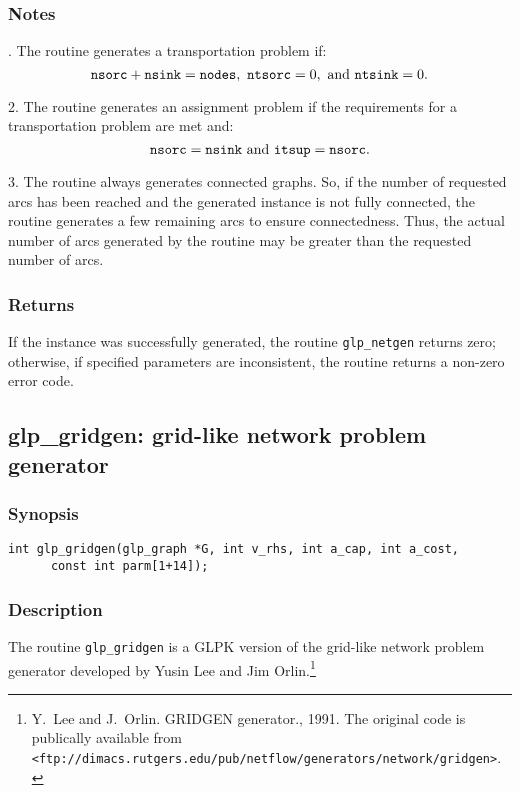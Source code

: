 \subsubsection*{Notes}

\noindent{}. The routine generates a transportation problem if:
$${\tt nsorc}+{\tt nsink}={\tt nodes},
\  {\tt ntsorc}=0,\ \mbox{and}\ {\tt ntsink}=0.$$

2. The routine generates an assignment problem if the requirements for
a transportation problem are met and:
$${\tt nsorc}={\tt nsink}\ \mbox{and}\ {\tt itsup}={\tt nsorc}.$$

3. The routine always generates connected graphs. So, if the number of
requested arcs has been reached and the generated instance is not fully
connected, the routine generates a few remaining arcs to ensure
connectedness. Thus, the actual number of arcs generated by the routine
may be greater than the requested number of arcs.

\subsubsection*{Returns}

If the instance was successfully generated, the routine
\verb|glp_netgen| returns zero; otherwise, if specified parameters are
inconsistent, the routine returns a non-zero error code.

\subsection{glp\_gridgen: grid-like network problem generator}

\subsubsection*{Synopsis}

\begin{verbatim}
int glp_gridgen(glp_graph *G, int v_rhs, int a_cap, int a_cost,
      const int parm[1+14]);
\end{verbatim}

\subsubsection*{Description}

The routine \verb|glp_gridgen| is a GLPK version of the grid-like
network problem generator developed by Yusin Lee and Jim
Orlin.\footnote{Y.~Lee and J.~Orlin. GRIDGEN generator., 1991. The
original code is publically available from
{\tt<ftp://dimacs.rutgers.edu/pub/netflow/generators/network/gridgen>}.}

